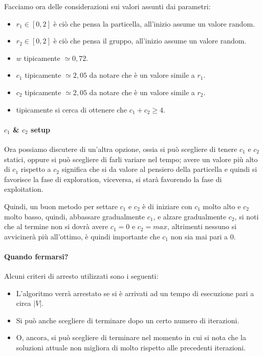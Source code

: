 \documentclass[12pt,a4paper]{report}
\begin{document}
Facciamo ora delle considerazioni sui valori assunti dai parametri:
\begin{itemize}
\item $r_1 \in [0, 2]$ è ciò che pensa la particella, all'inizio assume un valore random.
\item $r_2 \in [0, 2]$ è ciò che pensa il gruppo, all'inizio assume un valore random.
\item $w$ tipicamente $\simeq 0,72$.
\item $c_1$ tipicamente $\simeq 2,05$ da notare che è un valore simile a $r_1$.
\item $c_2$ tipicamente $\simeq 2,05$ da notare che è un valore simile a $r_2$.
\item tipicamente si cerca di ottenere che $c_1 + c_2 \geq 4$.
\end{itemize}

\paragraph{$c_1$ \& $c_2$ setup}
Ora possiamo discutere di un'altra opzione, ossia si può scegliere di tenere $c_1$ e $c_2$ statici, oppure si può scegliere di farli variare nel tempo; avere un valore più alto di $c_1$ rispetto a $c_2$ significa che si da valore al pensiero della particella e quindi si favorisce la fase di exploration, viceversa, si starà favorendo la fase di exploitation.

Quindi, un buon metodo per settare $c_1$ e $c_2$ è di iniziare con $c_1$ molto alto e $c_2$ molto basso, quindi, abbassare gradualmente $c_1$, e alzare gradualmente $c_2$, si noti che al termine non si dovrà avere $c_1 = 0$ e $c_2 = max$, altrimenti nessuno si avvicinerà più all'ottimo, è quindi importante che $c_1$ non sia mai pari a $0$.

\paragraph{Quando fermarsi?}
Alcuni criteri di arresto utilizzati sono i seguenti:
\begin{itemize}
\item L'algoritmo verrà arrestato se si è arrivati ad un tempo di esecuzione pari a circa $\vert V \vert$.
\item Si può anche scegliere di terminare dopo un certo numero di iterazioni.
\item O, ancora, si può scegliere di terminare nel momento in cui si nota che la soluzioni attuale non migliora di molto rispetto alle precedenti iterazioni.
\end{itemize}
\end{document}
